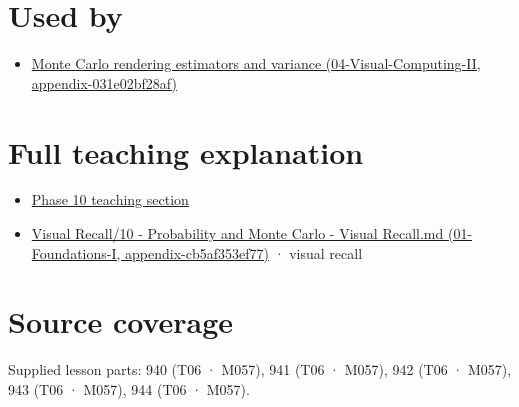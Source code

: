 \section{Used by}\label{appendix-8d863ed954d0-used-by}

\begin{itemize}
\tightlist
\item
  \href{../04-Visual-Computing-II/main.pdf\#nameddest=appendix-031e02bf28af}{Monte Carlo rendering estimators and variance (04-Visual-Computing-II, appendix-031e02bf28af)}
\end{itemize}

\section{Full teaching explanation}\label{appendix-8d863ed954d0-full-teaching-explanation}

\begin{itemize}
\tightlist
\item
  \href{Continuous\%20Notes/Computing\%20Foundations\%20-\%20From\%20Bits\%20to\%20C++\%20and\%20Systems\%20APIs\#7.\%20Transformations\%20turn\%20simple\%20inputs\%20into\%20useful\%20samples}{Phase 10 teaching section}
\item
  \href{../01-Foundations-I/main.pdf\#nameddest=appendix-cb5af353ef77}{Visual Recall/10 - Probability and Monte Carlo - Visual Recall.md (01-Foundations-I, appendix-cb5af353ef77)} · visual recall
\end{itemize}

\section{Source coverage}\label{appendix-8d863ed954d0-source-coverage}

Supplied lesson parts: 940 (T06 · M057), 941 (T06 · M057), 942 (T06 · M057), 943 (T06 · M057), 944 (T06 · M057).
